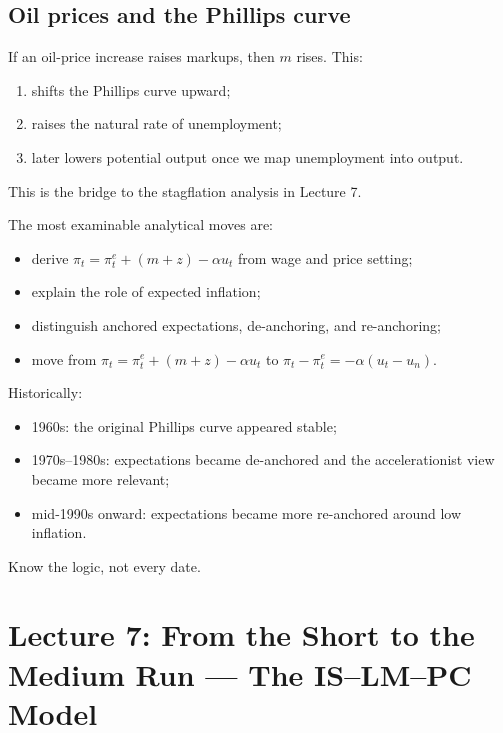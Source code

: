 \documentclass[12pt]{article}
\begin{document}
\subsection{Oil prices and the Phillips curve}

If an oil-price increase raises markups, then $m$ rises. This:
\begin{enumerate}[leftmargin=1.5em]
\item shifts the Phillips curve upward;
\item raises the natural rate of unemployment;
\item later lowers potential output once we map unemployment into output.
\end{enumerate}
This is the bridge to the stagflation analysis in Lecture 7.

\begin{examtip}[title={Exam Focus: High priority for short-answer}]
The most examinable analytical moves are:
\begin{itemize}[leftmargin=1.5em]
\item derive $\pi_t=\pi_t^e+(m+z)-\alpha u_t$ from wage and price setting;
\item explain the role of expected inflation;
\item distinguish anchored expectations, de-anchoring, and re-anchoring;
\item move from $\pi_t=\pi_t^e+(m+z)-\alpha u_t$ to $\pi_t-\pi_t^e=-\alpha(u_t-u_n)$.
\end{itemize}
\end{examtip}

\begin{examtip}[title={Exam Focus: Likely MCQ-style recognition}]
Historically:
\begin{itemize}[leftmargin=1.5em]
\item 1960s: the original Phillips curve appeared stable;
\item 1970s--1980s: expectations became de-anchored and the accelerationist view became more relevant;
\item mid-1990s onward: expectations became more re-anchored around low inflation.
\end{itemize}
Know the logic, not every date.
\end{examtip}

\newpage


\section{Lecture 7: From the Short to the Medium Run --- The IS--LM--PC Model}
\end{document}
